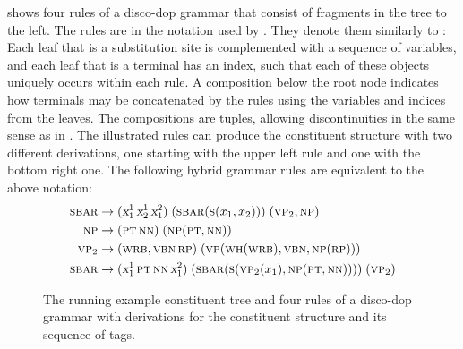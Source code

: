 \documentclass[../../document.tex]{subfiles}
\begin{document}
    \begin{example}\label{ex:dop}
         shows four rules of a disco-dop grammar that consist of fragments in the tree to the left.
        The rules are in the notation used by \citet{CraSchBod16}.
        They denote them similarly to :
            Each leaf that is a substitution site is complemented with a sequence of variables, and each leaf that is a terminal has an index, such that each of these objects uniquely occurs within each rule.
            A composition below the root node indicates how terminals may be concatenated by the rules using the variables and indices from the leaves.
            The compositions are tuples, allowing discontinuities in the same sense as in .
        The illustrated rules can produce the constituent structure with two different derivations, one starting with the upper left rule and one with the bottom right one.
        The following hybrid grammar rules are equivalent to the above notation: \begin{align*}
            \textsc{sbar} &\to (\textsl{x}_1^1 \, \textsl{x}_2^1 \, \textsl{x}_1^2)\;(\textsc{sbar} (\textsc{s} (x_1, x_2)))\;(\textsc{vp}_2, \textsc{np}) \\
            \textsc{np} &\to (\textsc{pt} \, \textsc{nn})\;(\textsc{np} (\textsc{pt}, \textsc{nn})) \\
            \textsc{vp}_2 &\to (\textsc{wrb}, \textsc{vbn} \, \textsc{rp})\;(\textsc{vp} (\textsc{wh}(\textsc{wrb}),\textsc{vbn},\textsc{np}(\textsc{rp}))) \\
            \textsc{sbar} &\to (\textsl{x}_1^1 \, \textsc{pt} \, \textsc{nn} \, \textsl{x}_1^2)\;(\textsc{sbar} (\textsc{s} (\textsc{vp}_2(x_1),\textsc{np}(\textsc{pt}, \textsc{nn}))))\;(\textsc{vp}_2)
        \end{align*}
    \end{example}

    \begin{figure}
        \null\hfill
        
        \hspace{1cm}
        
        \hfill\null
        \caption{\label{fig:ex:dop}
            The running example constituent tree and four rules of a disco-dop grammar with derivations for the constituent structure and its sequence of  tags.}
    \end{figure}
\end{document}
